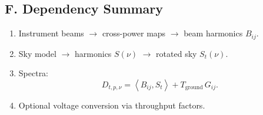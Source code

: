 \documentclass[11pt]{article}
\begin{document}
\subsection*{F. Dependency Summary}

\begin{enumerate}
\item Instrument beams $\rightarrow$ cross-power maps $\rightarrow$ beam harmonics $B_{ij}$.
\item Sky model $\rightarrow$ harmonics $S(\nu)$ $\rightarrow$ rotated sky $S_t(\nu)$.
\item Spectra:
\[
D_{t,p,\nu}
=
\left\langle B_{ij}, S_t \right\rangle
+
T_{\mathrm{ground}}\,G_{ij}.
\]
\item Optional voltage conversion via throughput factors.
\end{enumerate}
\end{document}
